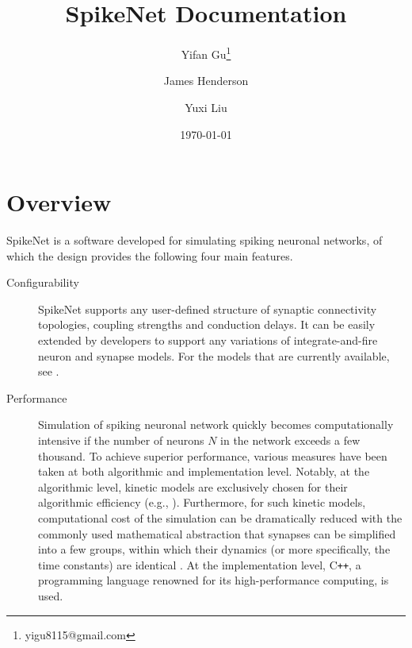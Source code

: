 \documentclass{article}
\title{SpikeNet Documentation}
\author[1]{Yifan Gu\thanks{yigu8115@gmail.com}}
\author[1]{James Henderson}
\author[1]{Yuxi Liu}
\affil[1]{School of Physics, University of Sydney, NSW 2006, Australia}
\date{\today}
\begin{document}
 \maketitle

\section{Overview}
SpikeNet is a software developed for simulating spiking neuronal networks, of which the design provides the following four main features.

\begin{description}

\item [Configurability] SpikeNet supports any user-defined structure of synaptic connectivity topologies, coupling strengths and conduction delays. It can be easily extended by developers to support any variations of integrate-and-fire neuron and synapse models. For the models that are currently available, see .

\item [Performance]  Simulation of spiking neuronal network quickly becomes computationally intensive if the number of neurons $N$ in the network exceeds a few thousand. To achieve superior performance, various measures have been taken at both algorithmic and implementation level. Notably, at the algorithmic level, kinetic models are exclusively chosen for their algorithmic efficiency (e.g., \cite{destexhe1998kinetic, vogels2011inhibitory, hennig2015theoretical, treves1993mean}). Furthermore, for such kinetic models, computational cost of the simulation can be dramatically reduced  with the commonly used mathematical abstraction that synapses can be simplified into a few groups, within which their dynamics (or more specifically, the time constants) are identical \cite{destexhe1994efficient}. At the implementation level, C\texttt{++}, a programming language renowned for its high-performance computing, is used.


\end{description}
\end{document}
